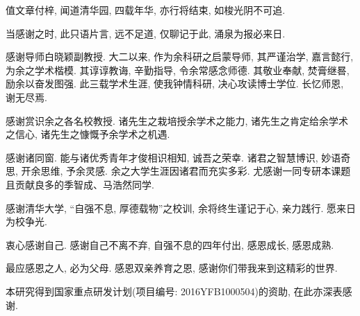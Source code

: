 \begin{acknowledgement}
值文章付梓, 闻道清华园, 四载年华, 亦行将结束, 如梭光阴不可追.

当感谢之时, 此只语片言, 远不足道, 仅聊记于此, 涌泉为报必来日.

感谢导师白晓颖副教授. 大二以来, 作为余科研之启蒙导师, 其严谨治学, 嘉言懿行, 为余之学术楷模. 其谆谆教诲, 辛勤指导, 令余常感念师德. 其敬业奉献, 焚膏继晷, 励余以奋发图强. 此三载学术生涯, 使我钟情科研, 决心攻读博士学位. 长忆师恩, 谢无尽焉.

感谢赏识余之各名校教授. 诸先生之栽培授余学术之能力, 诸先生之肯定给余学术之信心, 诸先生之慷慨予余学术之机遇.

感谢诸同窗. 能与诸优秀青年才俊相识相知, 诚吾之荣幸. 诸君之智慧博识, 妙语奇思, 开余思维, 予余灵感. 余之大学生涯因诸君而充实多彩. 尤感谢一同专研本课题且贡献良多的季智成、马浩然同学.

感谢清华大学, “自强不息, 厚德载物”之校训, 余将终生谨记于心, 亲力践行. 愿来日为校争光.

衷心感谢自己. 感谢自己不离不弃, 自强不息的四年付出, 感恩成长, 感恩成熟.

最应感恩之人, 必为父母. 感恩双亲养育之恩, 感谢你们带我来到这精彩的世界.

本研究得到国家重点研发计划(项目编号: 2016YFB1000504)的资助, 在此亦深表感谢.

\end{acknowledgement}
